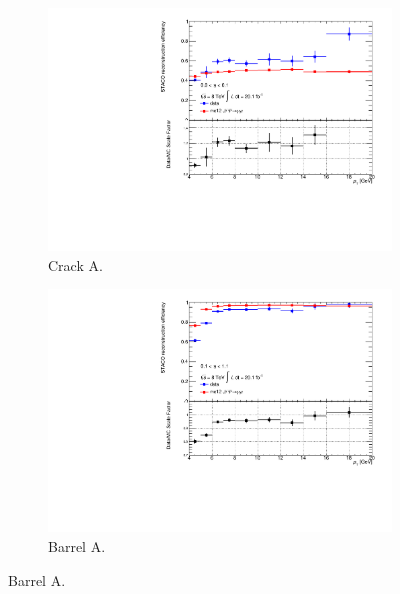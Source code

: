\begin{figure}[htbp]
  \centering
    \begin{subfigure}[b]{0.45\textwidth}
      \includegraphics[width=\textwidth]{PartCalibration2012/Plots/SFPlots/Crack_A_reco.pdf}
      \caption{Crack A.} \label{fig:CalibrationRecoSFCrackA}
    \end{subfigure}
    \hfill
    \begin{subfigure}[b]{0.45\textwidth}
      \includegraphics[width=\textwidth]{PartCalibration2012/Plots/SFPlots/Barrel_A_reco.pdf}
      \caption{Barrel A.} \label{fig:CalibrationRecoSFBarrelA}
    \end{subfigure}


\end{figure}
